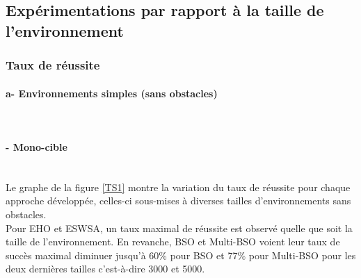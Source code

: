 	
	\subsection{Expérimentations par rapport à la taille de l'environnement}
	
	\subsubsection{Taux de réussite}
	\textbf{}
	
	\paragraph{a- Environnements simples (sans obstacles)}
	\textbf{}\\
	\noindent
	\begin{minipage}[t]{0.5\textwidth}
		\paragraph{- Mono-cible}
		\textbf{}\\
		Le graphe de la figure \ref{TS1} montre la variation du taux de réussite pour chaque approche développée, celles-ci sous-mises à diverses tailles d'environnements sans obstacles.\\
		
		Pour EHO et ESWSA, un taux maximal de réussite est observé quelle que soit la taille de l'environnement. En revanche, BSO et Multi-BSO voient leur taux de succès maximal diminuer jusqu'à 60\% pour BSO et 77\% pour Multi-BSO pour les deux dernières tailles c'est-à-dire 3000 et 5000.
		
		
		
	\end{minipage}\hfill
	\begin{minipage}[t]{0.55\textwidth}
		\captionsetup{width=0.8\linewidth}
		\centering{}
		\label{TS1}
	\end{minipage}\hfill
	
	\textbf{ }
	
